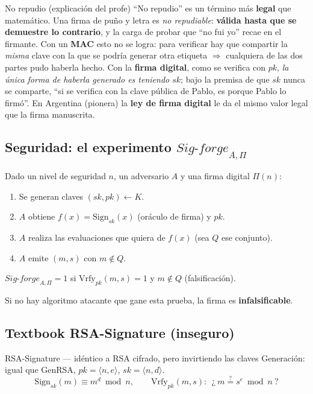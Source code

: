 \documentclass[11pt,a4paper]{article}
\newcommand{\Sign}{\mathrm{Sign}}
\newcommand{\Vrfy}{\mathrm{Vrfy}}
\begin{document}
\begin{defbox}{No repudio (explicación del profe)}
``No repudio'' es un término más \textbf{legal} que matemático. Una firma de puño y letra es
\emph{no repudiable}: \textbf{válida hasta que se demuestre lo contrario}, y la carga de probar
que ``no fui yo'' recae en el firmante. Con un \textbf{MAC} esto no se logra: para verificar hay
que compartir la \emph{misma} clave con la que se podría generar otra etiqueta $\Rightarrow$
cualquiera de las dos partes pudo haberla hecho. Con la \textbf{firma digital}, como se
verifica con $pk$, \emph{la única forma de haberla generado es teniendo $sk$}; bajo la premisa
de que $sk$ nunca se comparte, ``si se verifica con la clave pública de Pablo, es porque Pablo
lo firmó''. En Argentina (pionera) la \textbf{ley de firma digital} le da el mismo valor legal
que la firma manuscrita.
\end{defbox}

\subsection{Seguridad: el experimento $\textit{Sig-forge}_{A,\Pi}$}
\begin{slidebox}
Dado un nivel de seguridad $n$, un adversario $A$ y una firma digital $\Pi(n)$:
\begin{enumerate}[leftmargin=1.8em,itemsep=1pt]
  \item Se generan claves $(sk,pk)\leftarrow K$.
  \item $A$ obtiene $f(x)=\Sign_{sk}(x)$ (oráculo de firma) y $pk$.
  \item $A$ realiza las evaluaciones que quiera de $f(x)$ (sea $Q$ ese conjunto).
  \item $A$ emite $(m,s)$ con $m\notin Q$.
\end{enumerate}
$\textit{Sig-forge}_{A,\Pi}=1$ si $\Vrfy_{pk}(m,s)=1$ y $m\notin Q$ (falsificación).
\end{slidebox}
Si no hay algoritmo atacante que gane esta prueba, la firma es \textbf{infalsificable}.

\subsection{Textbook RSA-Signature (inseguro)}
\begin{defbox}{RSA-Signature — idéntico a RSA cifrado, pero invirtiendo las claves}
Generación: igual que GenRSA, $pk=\langle n,e\rangle$, $sk=\langle n,d\rangle$.
\[
  \Sign_{sk}(m) \equiv m^{d}\bmod n, \qquad
  \Vrfy_{pk}(m,s):\ \ \text{¿}\ m \stackrel{?}{=} s^{e}\bmod n\ \text{?}
\]
\end{defbox}
\end{document}
